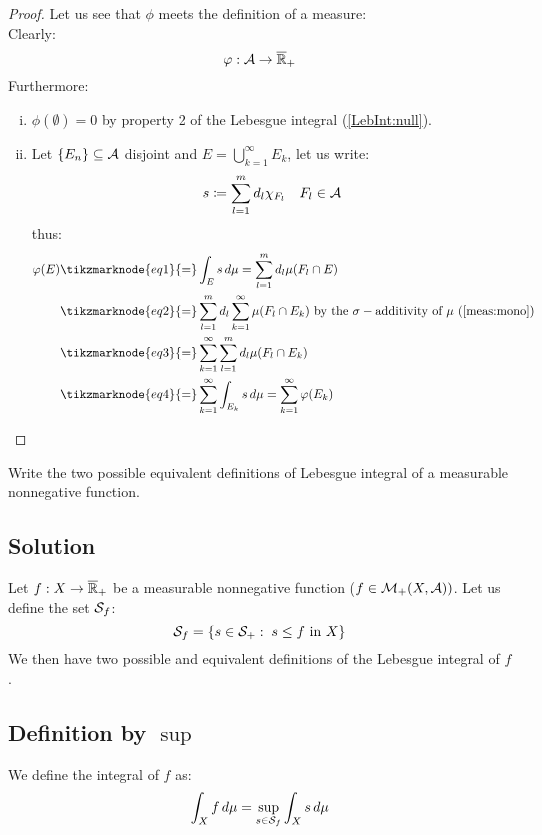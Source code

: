 \begin{proof}
    Let us see that $\phi$ meets the definition of a measure:\\
    Clearly:
    \[
        \varphi : \mathcal{A} \to \overline{\mathbb{R}}_{+}    
    \]
    Furthermore:
    \begin{enumerate}[i)]
        \item $\phi(\emptyset) = 0$ by property 2 of the Lebesgue integral (\ref{LebInt:null}).
        \item Let $\{ E_n \}\subseteq\mathcal{A}$ disjoint and $E=\bigcup_{k=1}^\infty E_k$, let us write:
            \[
                s \coloneqq \sum_{l=1}^m d_l \chi_{F_l} \quad F_l \in \mathcal{A}    
            \]
            thus:
            \begin{align*}
                \phi(E) &\tikzmarknode{eq1}{=} \int_E s\,d\mu = \sum_{l=1}^m d_l \mu(F_l\cap E) \\
                &\tikzmarknode{eq2}{=} \sum_{l=1}^m d_l \sum_{k=1}^\infty \mu(F_l\cap E_k) \text{ by the $\s{additivity}$ of $\mu$ (\ref{meas:mono})}\\
                &\tikzmarknode{eq3}{=} \sum_{k=1}^\infty \sum_{l=1}^m d_l \mu(F_l\cap E_k) \\
                &\tikzmarknode{eq4}{=} \sum_{k=1}^\infty \int_{E_k} s \, d\mu = \sum_{k=1}^\infty \phi(E_k)
            \end{align*} 
    \end{enumerate}
\end{proof}


\question

Write the two possible equivalent definitions of Lebesgue integral of a measurable nonnegative function.

\subsection*{Solution}

Let $f:X\to\overline{\mathbb{R}}_{+}$ be a measurable nonnegative function ($f\in\mathcal{M}_+(X,\mathcal{A}))$. Let us define the set $\mathcal{S}_f$:
\[
    \mathcal{S}_f = \{ s\in \mathcal{S}_+ : \; s\leq f \text{ in } X\}    
\]
We then have two possible and equivalent definitions of the Lebesgue integral of $f$.

\subsection{Definition by \texorpdfstring{$\sup$}{the supremum}}
We define the integral of $f$ as:
\[
    \int_X f \,d\mu = \sup_{s\in\mathcal{S}_f} \int_X s \,d\mu
\]

